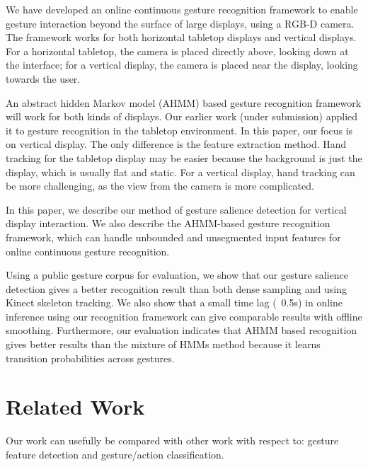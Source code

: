 \documentclass{sigchi}
\begin{document}
We have developed an online continuous gesture recognition framework to enable gesture interaction beyond the surface
of large displays, using a RGB-D camera. The framework works for both horizontal tabletop displays and vertical displays.
For a horizontal tabletop, the camera is placed directly above, looking down at the interface; for a vertical display, 
the camera is placed near the display, looking towards the user. 

An abstract hidden Markov model (AHMM) based gesture recognition framework
will work for both kinds of displays. Our earlier work (under submission) applied it to gesture recognition in the tabletop environment.
In this paper, our focus is on vertical display.
The only difference is the feature extraction method. Hand tracking for the tabletop display may be easier because the 
background is just the display, which is usually flat and static. For a vertical display, hand tracking can be more challenging, as the view 
from the camera is more complicated.

In this paper, we describe our method of gesture salience detection for vertical display interaction. We also describe the AHMM-based
gesture recognition framework, which can handle unbounded and unsegmented input features for online continuous gesture recognition.

Using a public gesture corpus for evaluation, we show that our gesture salience detection gives a better recognition result than both dense sampling and using 
Kinect skeleton tracking. We also show that a small time lag (~0.5s) in online inference using our recognition framework can give comparable results with offline
smoothing. Furthermore, our evaluation indicates that AHMM based recognition gives better results than the mixture of HMMs method because it learns transition probabilities across gestures.

\section{Related Work}
Our work can usefully be compared with other work with respect to: gesture feature detection and gesture/action classification.  
\end{document}
